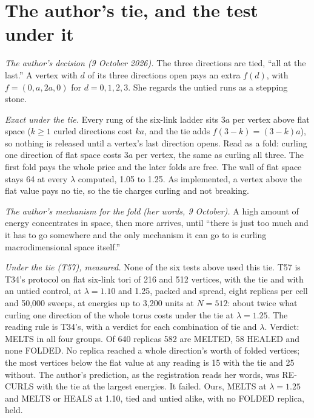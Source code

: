\documentclass[aps,pre,10pt,twocolumn,superscriptaddress,nofootinbib]{revtex4-2}
\begin{document}
\section{The author's tie, and the test under it}\label{sec:tie}

\emph{The author's decision (9 October 2026).} The three directions are tied, ``all at the last.'' A vertex with $d$
of its three directions open pays an extra $f(d)$, with $f = (0, a, 2a, 0)$ for $d = 0, 1, 2, 3$. She regards the
untied runs as a stepping stone.

\emph{Exact under the tie.} Every rung of the six-link ladder sits $3a$ per vertex above flat space ($k \geq 1$
curled directions cost $ka$, and the tie adds $f(3 - k) = (3 - k)a$), so nothing is released until a vertex's last
direction opens. Read as a fold: curling one direction of flat space costs $3a$ per
vertex, the same as curling all three. The first fold pays the whole price and the later folds are free. The wall of
flat space stays 64 at every $\lambda$ computed, 1.05 to 1.25. As implemented, a vertex above the flat value pays
no tie, so the tie charges curling and not breaking.

\emph{The author's mechanism for the fold (her words, 9 October).} A high amount of energy concentrates in space,
then more arrives, until ``there is just too much and it has to go somewhere and the only mechanism it can go to is
curling macrodimensional space itself.''

\emph{Under the tie (T57), measured.} None of the six tests above used this tie. T57 is T34's protocol on flat
six-link tori of 216 and 512 vertices, with the tie and with an untied control, at $\lambda = 1.10$ and 1.25, packed
and spread, eight replicas per cell and 50,000 sweeps, at energies up to 3,200 units at $N = 512$: about twice what
curling one direction of the whole torus costs under the tie at $\lambda = 1.25$. The reading rule is T34's, with a
verdict for each combination of tie and $\lambda$. Verdict: MELTS in all four groups. Of 640 replicas 582 are MELTED, 58
HEALED and none FOLDED. No replica reached a whole direction's worth of folded vertices; the most vertices below the
flat value at any reading is 15 with the tie and 25 without. The author's prediction, as the registration reads
her words, was RE-CURLS with the tie at the largest energies. It failed. Ours, MELTS at $\lambda = 1.25$ and MELTS or
HEALS at 1.10, tied and untied alike, with no FOLDED replica, held.
\end{document}
